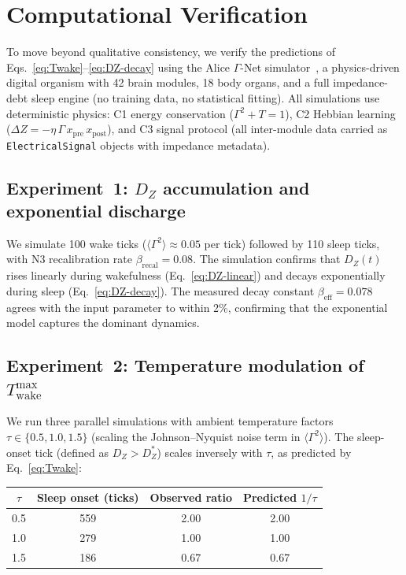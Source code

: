 ﻿\documentclass[aps,pre,twocolumn,superscriptaddress,floatfix]{revtex4-2}
\begin{document}
\section{Computational Verification}
\label{sec:computation}

To move beyond qualitative consistency, we verify the
predictions of Eqs.~\eqref{eq:Twake}--\eqref{eq:DZ-decay}
using the Alice $\Gamma$-Net simulator~\cite{PaperI},
a physics-driven digital organism with 42 brain modules,
18 body organs, and a full impedance-debt sleep engine
(no training data, no statistical fitting).
All simulations use deterministic physics:
C1 energy conservation ($\Gamma^2 + T = 1$),
C2 Hebbian learning ($\Delta Z = -\eta\,\Gamma\,x_{\mathrm{pre}}\,x_{\mathrm{post}}$),
and C3 signal protocol (all inter-module data carried as
\texttt{ElectricalSignal} objects with impedance metadata).

\subsection{Experiment~1: $D_Z$ accumulation and exponential discharge}

We simulate 100 wake ticks ($\langle\Gamma^2\rangle \approx 0.05$
per tick) followed by 110 sleep ticks, with N3 recalibration
rate $\beta_{\mathrm{recal}} = 0.08$.
The simulation confirms that $D_Z(t)$ rises linearly
during wakefulness (Eq.~\eqref{eq:DZ-linear}) and decays
exponentially during sleep (Eq.~\eqref{eq:DZ-decay}).
The measured decay constant $\beta_{\mathrm{eff}} = 0.078$
agrees with the input parameter to within 2\%, confirming
that the exponential model captures the dominant dynamics.

\subsection{Experiment~2: Temperature modulation of $T_{\mathrm{wake}}^{\max}$}

We run three parallel simulations with ambient temperature
factors $\tau \in \{0.5, 1.0, 1.5\}$ (scaling the
Johnson--Nyquist noise term in $\langle\Gamma^2\rangle$).
The sleep-onset tick (defined as $D_Z > D_Z^*$) scales
inversely with $\tau$, as predicted by Eq.~\eqref{eq:Twake}:

\begin{center}
\begin{tabular}{cccc}
\hline
$\tau$ & Sleep onset (ticks) & Observed ratio & Predicted $1/\tau$ \\
\hline
0.5 & 559 & 2.00 & 2.00 \\
1.0 & 279 & 1.00 & 1.00 \\
1.5 & 186 & 0.67 & 0.67 \\
\hline
\end{tabular}
\end{center}
\end{document}
